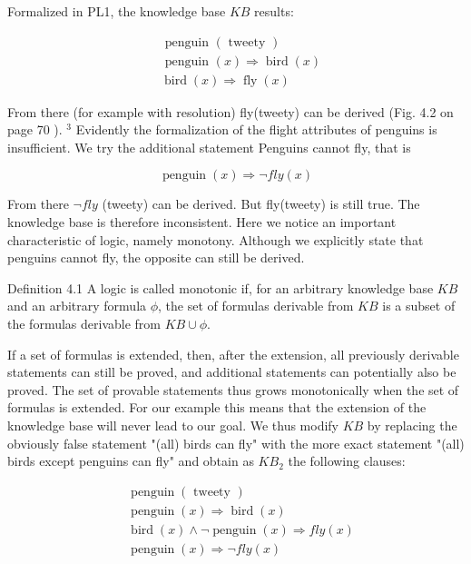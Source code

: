 \documentclass[10pt]{article}
\begin{document}
Formalized in PL1, the knowledge base $K B$ results:

$$
\begin{aligned}
& \text { penguin }(\text { tweety }) \\
& \text { penguin }(x) \Rightarrow \operatorname{bird}(x) \\
& \operatorname{bird}(x) \Rightarrow \operatorname{fly}(x)
\end{aligned}
$$

From there (for example with resolution) fly(tweety) can be derived (Fig. 4.2 on page 70 ). ${ }^{3}$ Evidently the formalization of the flight attributes of penguins is insufficient. We try the additional statement Penguins cannot fly, that is

$$
\operatorname{penguin}(x) \Rightarrow \neg f l y(x)
$$

From there $\neg f l y$ (tweety) can be derived. But fly(tweety) is still true. The knowledge base is therefore inconsistent. Here we notice an important characteristic of logic, namely monotony. Although we explicitly state that penguins cannot fly, the opposite can still be derived.

Definition 4.1 A logic is called monotonic if, for an arbitrary knowledge base $K B$ and an arbitrary formula $\phi$, the set of formulas derivable from $K B$ is a subset of the formulas derivable from $K B \cup \phi$.

If a set of formulas is extended, then, after the extension, all previously derivable statements can still be proved, and additional statements can potentially also be proved. The set of provable statements thus grows monotonically when the set of formulas is extended. For our example this means that the extension of the knowledge base will never lead to our goal. We thus modify $K B$ by replacing the obviously false statement "(all) birds can fly" with the more exact statement "(all) birds except penguins can fly" and obtain as $K B_{2}$ the following clauses:

$$
\begin{aligned}
& \operatorname{penguin}(\text { tweety }) \\
& \operatorname{penguin}(x) \Rightarrow \operatorname{bird}(x) \\
& \operatorname{bird}(x) \wedge \neg \operatorname{penguin}(x) \Rightarrow f l y(x) \\
& \operatorname{penguin}(x) \Rightarrow \neg f l y(x)
\end{aligned}
$$
\end{document}
